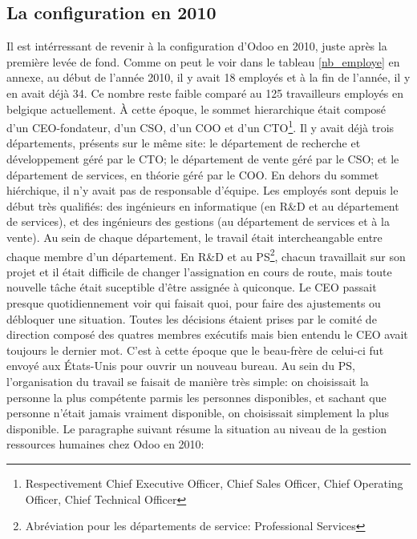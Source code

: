 \subsection{La configuration en 2010}
Il est intérressant de revenir à la configuration d'Odoo en 2010, juste après la première levée de fond. Comme on peut le voir dans le tableau \ref{nb_employe} en annexe, au début de l'année 2010, il y avait 18 employés et à la fin de l'année, il y en avait déjà 34. Ce nombre reste faible comparé au 125 travailleurs employés en belgique actuellement. À cette époque, le sommet hierarchique était composé d'un CEO-fondateur, d'un CSO, d'un COO et d'un CTO\footnote{Respectivement Chief Executive Officer, Chief Sales Officer, Chief Operating Officer, Chief Technical Officer}. Il y avait déjà trois départements, présents sur le même site: le département de recherche et développement géré par le CTO; le département de vente géré par le CSO; et le département de services, en théorie géré par le COO. En dehors du sommet hiérchique, il n'y avait pas de responsable d'équipe. Les employés sont depuis le début très qualifiés: des ingénieurs en informatique (en R\&D et au département de services), et des ingénieurs des gestions (au département de services et à la vente). Au sein de chaque département, le travail était intercheangable entre chaque membre d'un département. En R\&D et au PS\footnote{Abréviation pour les départements de service: Professional Services}, chacun travaillait sur son projet et il était difficile de changer l'assignation en cours de route, mais toute nouvelle tâche était suceptible d'être assignée à quiconque. Le CEO passait presque quotidiennement voir qui faisait quoi, pour faire des ajustements ou débloquer une situation. Toutes les décisions étaient prises par le comité de direction composé des quatres membres exécutifs mais bien entendu le CEO avait toujours le dernier mot. C'est à cette époque que le beau-frère de celui-ci fut envoyé aux États-Unis pour ouvrir un nouveau bureau. Au sein du PS, l'organisation du travail se faisait de manière très simple: on choisissait la personne la plus compétente parmis les personnes disponibles, et sachant que personne n'était jamais vraiment disponible, on choisissait simplement la plus disponible. Le paragraphe suivant résume la situation au niveau de la gestion ressources humaines chez Odoo en 2010:

